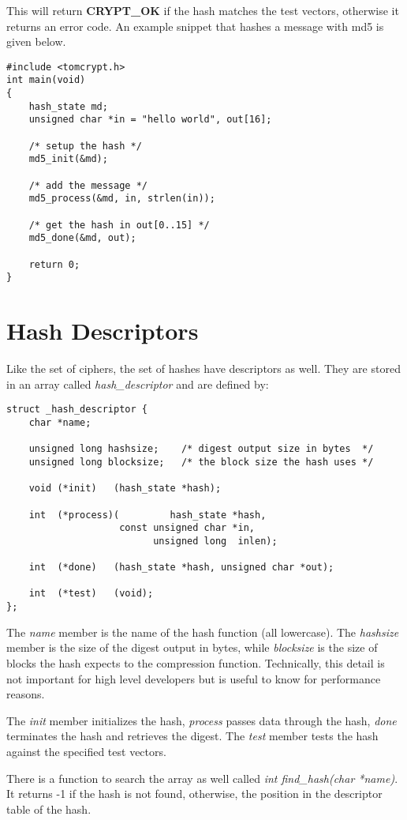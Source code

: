 \documentclass[synpaper]{book}
\newcommand{\mysection}[1]    %
	{                   %
	\section{#1}
   \markboth{\textsf{www.libtom.org}}{\thesection ~ {#1}}
	}
\begin{document}
This will return {\bf CRYPT\_OK} if the hash matches the test vectors, otherwise it returns an error code.  An
example snippet that hashes a message with md5 is given below.
\begin{small}
\begin{verbatim}
#include <tomcrypt.h>
int main(void)
{
    hash_state md;
    unsigned char *in = "hello world", out[16];

    /* setup the hash */
    md5_init(&md);

    /* add the message */
    md5_process(&md, in, strlen(in));

    /* get the hash in out[0..15] */
    md5_done(&md, out);

    return 0;
}
\end{verbatim}
\end{small}

\mysection{Hash Descriptors}
Like the set of ciphers, the set of hashes have descriptors as well.  They are stored in an array called \textit{hash\_descriptor} and
are defined by:
\begin{verbatim}
struct _hash_descriptor {
    char *name;

    unsigned long hashsize;    /* digest output size in bytes  */
    unsigned long blocksize;   /* the block size the hash uses */

    void (*init)   (hash_state *hash);

    int  (*process)(         hash_state *hash, 
                    const unsigned char *in, 
                          unsigned long  inlen);

    int  (*done)   (hash_state *hash, unsigned char *out);

    int  (*test)   (void);
};
\end{verbatim}

The \textit{name} member is the name of the hash function (all lowercase).  The \textit{hashsize} member is the size of the digest output
in bytes, while \textit{blocksize} is the size of blocks the hash expects to the compression function.  Technically, this detail is not important
for high level developers but is useful to know for performance reasons.  

The \textit{init} member initializes the hash, \textit{process} passes data through the hash, \textit{done} terminates the hash and retrieves the 
digest.  The \textit{test} member tests the hash against the specified test vectors.

There is a function to search the array as well called \textit{int find\_hash(char *name)}.  It returns -1 if the hash is not found, otherwise, the
position in the descriptor table of the hash.
\end{document}
